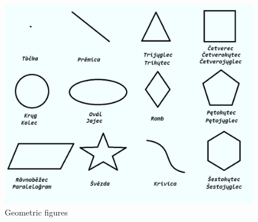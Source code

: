 \begin{figure}
	\includegraphics[width=\linewidth]{./sources/figures.jpeg}
	\caption{Geometric figures}
	\label{fig:figures}
\end{figure}